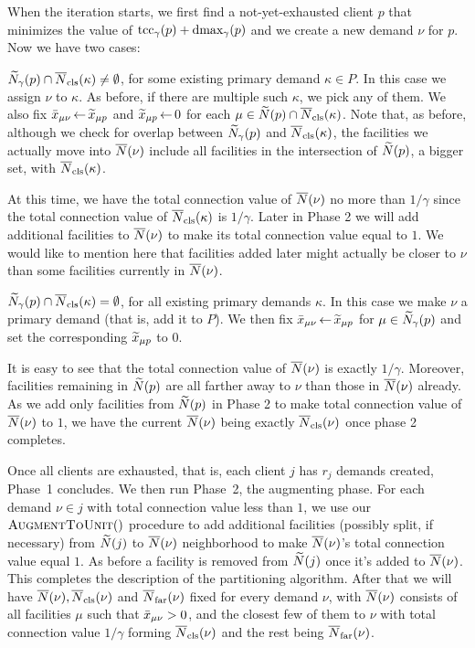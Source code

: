 When the iteration starts, we first find a not-yet-exhausted client
$p$ that minimizes the value of $\textrm{tcc}_\gamma(p) + \text{dmax}_\gamma(p)$ and
we create a new demand $\nu$ for $p$.  Now we have two cases:
%
\begin{description}
%
\item{} ${\widetilde N}_{\gamma}(p) \cap
  {\overline{N}}_{\text{cls}}(\kappa)\neq\emptyset$, for some existing primary demand
  $\kappa\in P$.  In this case we assign $\nu$ to $\kappa$. As before, if
  there are multiple such $\kappa$, we pick any of them. We also fix
  ${\bar x}_{\mu \nu} {\,\leftarrow\,} {\widetilde x}_{\mu p}$ and ${\widetilde x}_{\mu p}{\,\leftarrow\,} 0$
  for each $\mu \in {\widetilde N}(p)\cap {\overline{N}}_{\text{cls}}(\kappa)$. Note that, as before,
  although we check for overlap between ${\widetilde N}_{\gamma}(p)$ and
  ${\overline{N}}_{\text{cls}}(\kappa)$, the facilities we actually move into
  ${\overline{N}}(\nu)$ include all facilities in the intersection of
  ${\widetilde N}(p)$, a bigger set, with ${\overline{N}}_{\text{cls}}(\kappa)$.

  At this time, we have the total connection value of ${\overline{N}}(\nu)$ no
  more than $1/\gamma$ since the total connection value of
  ${\overline{N}}_{\text{cls}}(\kappa)$ is $1/\gamma$. Later in Phase 2 we will add
  additional facilities to ${\overline{N}}(\nu)$ to make its total connection
  value equal to $1$. We would like to mention here that facilities
  added later might actually be closer to $\nu$ than some facilities
  currently in ${\overline{N}}(\nu)$.

%
\item{} ${\widetilde N}_{\gamma}(p) \cap {\overline{N}}_{\text{cls}}(\kappa) =
  \emptyset$, for all existing primary demands $\kappa$.  In this case
  we make $\nu$ a primary demand (that is, add it to $P$). We then fix ${\bar x}_{\mu \nu}{\,\leftarrow\,}
  {\widetilde x}_{\mu p}$ for $\mu \in {\widetilde N}_{\gamma}(p)$ and set the
  corresponding ${\widetilde x}_{\mu p}$ to $0$.  

  It is easy to see that the total connection value of ${\overline{N}}(\nu)$
  is exactly $1/\gamma$. Moreover, facilities remaining in
  ${\widetilde N}(p)$ are all farther away to $\nu$ than those in
  ${\overline{N}}(\nu)$ already. As we add only facilities from ${\widetilde N}(p)$
  in Phase 2 to make total connection value of ${\overline{N}}(\nu)$ to $1$,
  we have the current ${\overline{N}}(\nu)$ being exactly ${\overline{N}}_{\text{cls}}(\nu)$
  once phase 2 completes.
%
\end{description}
%
Once all clients are exhausted, that is, each client $j$ has $r_j$
demands created, Phase~1 concludes. We then run Phase~2, the
augmenting phase.  For each demand $\nu\in j$ with total connection
value less than $1$, we use our ${\textsc{AugmentToUnit}}()$ procedure to add
additional facilities (possibly split, if necessary) from
${\widetilde N}(j)$ to ${\overline{N}}(\nu)$ neighborhood to make ${\overline{N}}(\nu)$'s
total connection value equal $1$. As before a facility is removed from
${\widetilde N}(j)$ once it's added to ${\overline{N}}(\nu)$.  This
completes the description of the partitioning algorithm. After that we
will have ${\overline{N}}(\nu), {\overline{N}}_{\text{cls}}(\nu)$ and ${\overline{N}}_{\text{far}}(\nu)$ fixed
for every demand $\nu$, with ${\overline{N}}(\nu)$ consists of all facilities
$\mu$ such that ${\bar x}_{\mu\nu} > 0$, and the closest few of them to
$\nu$ with total connection value $1/\gamma$ forming ${\overline{N}}_{\text{cls}}(\nu)$
and the rest being ${\overline{N}}_{\text{far}}(\nu)$.

